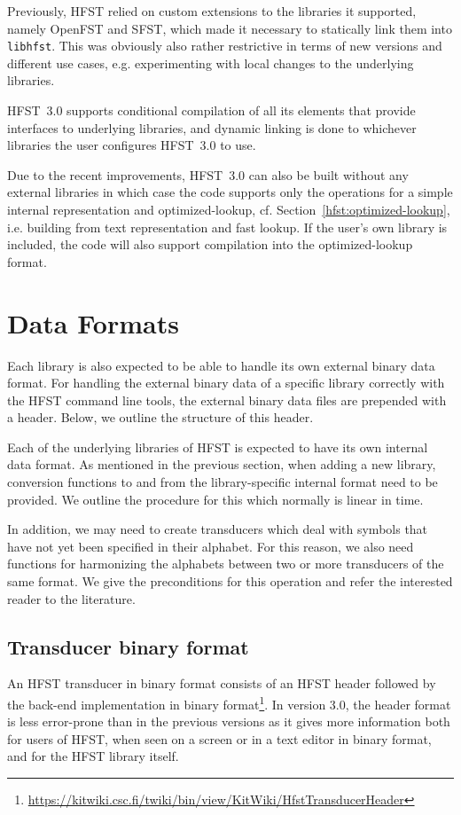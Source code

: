 \documentclass{llncs}
\begin{document}
Previously, HFST relied on custom extensions to the libraries it supported,
namely OpenFST and SFST, which made it necessary to statically link them into
\verb+libhfst+. This was obviously also rather restrictive in terms of
new versions and different use cases, e.g. experimenting with local changes to
the underlying libraries.

HFST~3.0 supports conditional compilation of all its elements that provide
interfaces to underlying libraries, and dynamic linking is done to whichever
libraries the user configures HFST~3.0 to use.

Due to the recent improvements, HFST~3.0 can also be built without any external
libraries in which case the code supports only the operations for a simple internal
representation and optimized-lookup, cf. Section~\ref{hfst:optimized-lookup},
i.e. building from text representation and fast lookup. If the user's own library is included, 
the code will also support compilation into the optimized-lookup format.


\section{Data Formats}\label{hfst:data-formats}
Each library is also expected to be able to handle its own external binary data format.
For handling the external binary data of a specific library correctly with the HFST command line tools, 
the external binary data files are prepended with a header. Below, we outline the structure 
of this header.

Each of the underlying libraries of HFST is expected to have its own internal data format. 
As mentioned in the previous section, when adding a new library, conversion functions 
to and from the library-specific internal format need to be provided. We outline the procedure
for this which normally is linear in time.

In addition, we may need to create transducers which deal with symbols that have
not yet been specified in their alphabet. For this reason, we also need functions for harmonizing 
the alphabets between two or more transducers of the same format. We give the
preconditions for this operation and refer the interested reader to the literature.

\subsection{Transducer binary format}
An HFST transducer in binary format consists of an HFST header followed by the
back-end implementation in binary 
format\footnote{\url{https://kitwiki.csc.fi/twiki/bin/view/KitWiki/HfstTransducerHeader}}. 
In version 3.0, the header
format is less error-prone than in the previous versions as it gives more 
information both for users of HFST, when seen on a screen or in a
text editor in binary format, and for the HFST library itself.
 
\end{document}
